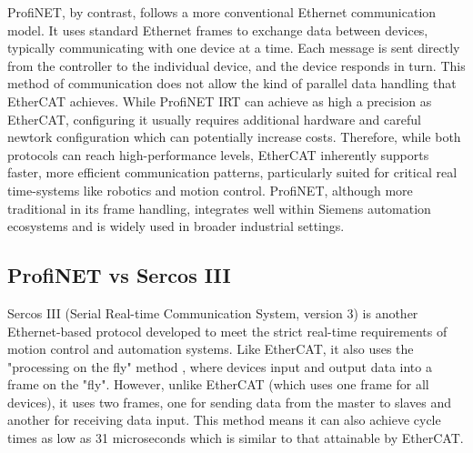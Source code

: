 \documentclass[conference]{IEEEtran}
\begin{document}
ProfiNET, by contrast, follows a more conventional Ethernet communication model. It uses standard Ethernet frames to exchange data between devices, typically communicating with one device at a time. Each message is sent directly from the controller to the individual device, and the device responds in turn. This method of communication does not allow the kind of parallel data handling that EtherCAT achieves. While ProfiNET IRT can achieve as high a precision as EtherCAT, configuring it usually requires additional hardware and careful newtork configuration \cite{WuXie2019} which can potentially increase costs.
Therefore, while both protocols can reach high-performance levels, EtherCAT inherently supports faster, more efficient communication patterns, particularly suited for critical real time-systems like robotics and motion control\cite{BeckhoffETG2023}. ProfiNET, although more traditional in its frame handling, integrates well within Siemens automation ecosystems and is widely used in broader industrial settings\cite{Eitel2020EtherNetVsPROFINET}.

\subsection{ProfiNET vs Sercos III}
Sercos III (Serial Real-time Communication System, version 3) is another Ethernet-based protocol developed to meet the strict real-time requirements of motion control and automation systems. Like EtherCAT, it also uses the  "processing on the fly" method , where devices input and output data into a frame on the "fly". However, unlike EtherCAT (which uses one frame for all devices), it uses two frames, one for sending data from the master to slaves and another for receiving data input. This method means it can also achieve cycle times as low as 31 microseconds\cite{hibbard2010sercos} which is similar to that attainable by EtherCAT.
\end{document}
